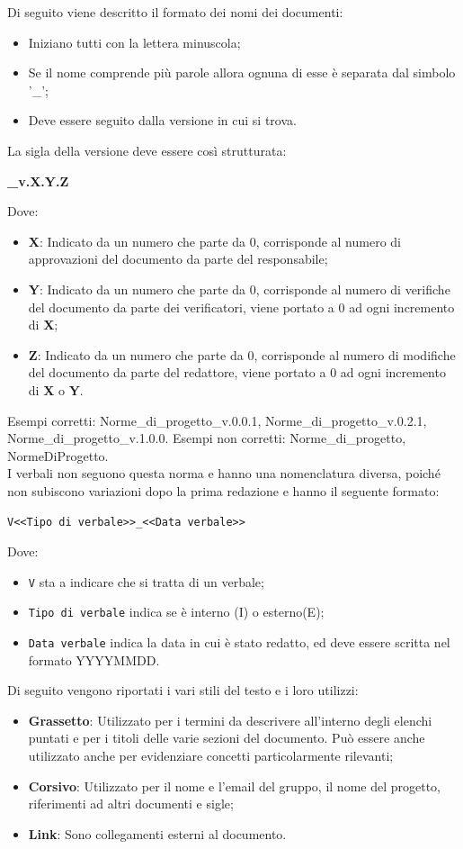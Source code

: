 Di seguito viene descritto il formato dei nomi dei documenti:
\begin{itemize}
\item Iniziano tutti con la lettera minuscola;
\item Se il nome comprende più parole allora ognuna di esse è separata dal simbolo '\_';
\item Deve essere seguito dalla versione in cui si trova.
\end{itemize}
La sigla della versione deve essere così strutturata:
\begin{center}
    \large{\textbf{\_v.X.Y.Z}}
\end{center}
Dove:
\begin{itemize}
\item \textbf{X}: Indicato da un numero che parte da 0, corrisponde al numero di approvazioni del documento da parte del responsabile;
\item \textbf{Y}: Indicato da un numero che parte da 0, corrisponde al numero di verifiche del documento da parte dei verificatori, viene portato a 0 ad ogni incremento di \textbf{X};
\item \textbf{Z}: Indicato da un numero che parte da 0, corrisponde al numero di modifiche del documento da parte del redattore, viene portato a 0 ad ogni incremento di \textbf{X} o \textbf{Y}.
\end{itemize}
Esempi corretti: Norme\_di\_progetto\_v.0.0.1, Norme\_di\_progetto\_v.0.2.1, Norme\_di\_progetto\_v.1.0.0.
Esempi non corretti: Norme\_di\_progetto, NormeDiProgetto.\\
I verbali non seguono questa norma e hanno una nomenclatura diversa, poiché non subiscono variazioni dopo la prima redazione e hanno il seguente formato: 
\begin{center}
	\verb|V<<Tipo di verbale>>_<<Data verbale>>|
\end{center}
Dove:
\begin{itemize}
	\item \verb|V| sta a indicare che si tratta di un verbale;
	\item \verb|Tipo di verbale| indica se è interno (I) o esterno(E);
	\item \verb|Data verbale| indica la data in cui è stato redatto, ed deve essere scritta nel formato YYYYMMDD.
\end{itemize}

Di seguito vengono riportati i vari stili del testo e i loro utilizzi:
\begin{itemize}
\item \textbf{Grassetto}: Utilizzato per i termini da descrivere all'interno degli elenchi puntati e per i titoli delle varie sezioni del documento. Può essere anche utilizzato anche per evidenziare concetti particolarmente rilevanti;
\item \textbf{Corsivo}: Utilizzato per il nome e l'email del gruppo, il nome del progetto, riferimenti ad altri documenti e sigle;
\item \textbf{Link}: Sono collegamenti esterni al documento.
\end{itemize}


